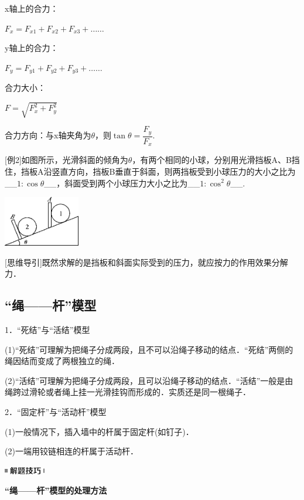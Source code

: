 x轴上的合力：

$F_x=F_{x1}+F_{x2}+F_{x3}+\ldots\ldots{}$

y轴上的合力：

$F_y=F_{y1}+F_{y2}+F_{y3}+\ldots\ldots{}$

合力大小：

$F=\sqrt{F_x^2+F_y^2}$

合力方向：与x轴夹角为$\theta$，则$\tan \theta=\dfrac{F_y}{F_x}$.

{[}例2{]}如图所示，光滑斜面的倾角为$\theta$，有两个相同的小球，分别用光滑挡板A、B挡住，挡板A沿竖直方向，挡板B垂直于斜面，则两挡板受到小球压力的大小之比为\_\_$1:\cos\theta$\_\_，斜面受到两个小球压力大小之比为\_\_$1:\cos^2\theta$\_\_.

\begin{center}\includegraphics[width=1.3125in,height=0.86458in]{media/image73.png}\end{center}

{[}思维导引{]}既然求解的是挡板和斜面实际受到的压力，就应按力的作用效果分解力．

\subsection{``绳------杆''模型}

1．``死结''与``活结''模型

(1)``死结''可理解为把绳子分成两段，且不可以沿绳子移动的结点．``死结''两侧的绳因结而变成了两根独立的绳．

(2)``活结''可理解为把绳子分成两段，且可以沿绳子移动的结点．``活结''一般是由绳跨过滑轮或者绳上挂一光滑挂钩而形成的．实质还是同一根绳子．

2．``固定杆''与``活动杆''模型

(1)一般情况下，插入墙中的杆属于固定杆(如钉子)．

(2)一端用铰链相连的杆属于活动杆．

\begin{center}\includegraphics[width=0.70833in,height=0.125in]{media/image37.png}

\textbf{``绳------杆''模型的处理方法}
\end{center}


